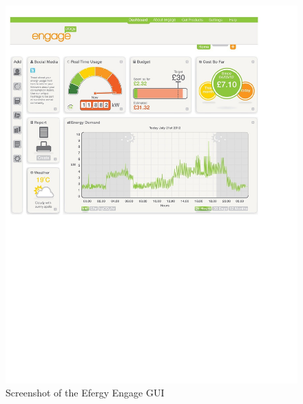 \begin{figure}[H]
\centering
\includegraphics[width=13cm, trim=0.4cm 12cm 3cm 0.7cm, clip]{ch/prestudy/fig/efergy.pdf}
\caption{Screenshot of the Efergy Engage GUI}
\label{fig:efergyGUI}
\end{figure}




